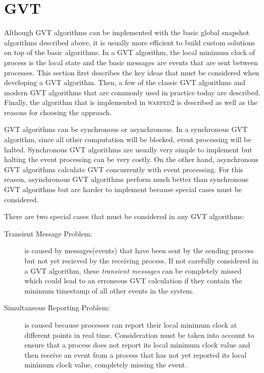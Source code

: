 \documentclass[11pt]{book}
\begin{document}
\section{GVT}

Although GVT algorithms can be implemented with the basic global snapshot algorithms described
above, it is usually more efficient to build custom solutions on top of the basic algorithms.
In a GVT algorithm, the local minimum clock of process is the local state and the basic
messages are events that are sent between processes. This section first describes the key
ideas that must be considered when developing a GVT algorithm. Then, a few of the classic
GVT algorithms and modern GVT algorithms that are commonly used in practice today are described.
Finally, the algorithm that is implemented in \textsc{warped2} is described as well as the
reasons for choosing the approach.

GVT algorithms can be synchronous or asynchronous. In a synchronous GVT algorithm, since
all other computation will be blocked, event processing will be halted. Synchronous GVT
algorithms are usually very simple to implement but halting the event processing can
be very costly. On the other hand, asynchronous GVT algorithms calculate GVT concurrently
with event processing. For this reason, asynchronous GVT algorithms perform much better
than synchronous GVT algorithms but are harder to implement because special cases must be
considered.

There are two special cases that must be considered in any GVT algorithms:

\begin{description}
    \item[Transient Message Problem:] is caused by messages(events) that have been sent by
    the sending process but not yet recieved by the receiving process. If not carefully
    considered in a GVT algorithm, these \emph{transient messages} can be completely missed
    which could lead to an erroneous GVT calculation if they contain the minimum timestamp
    of all other events in the system.
    \item[Simultaneous Reporting Problem:] is caused because processes can report their local
    minimum clock at different points in real time. Consideration must be taken into account
    to ensure that a process does not report its local minimum clock value and then receive
    an event from a process that has not yet reported its local minimum clock value,
    completely missing the event.
\end{description}
\end{document}
